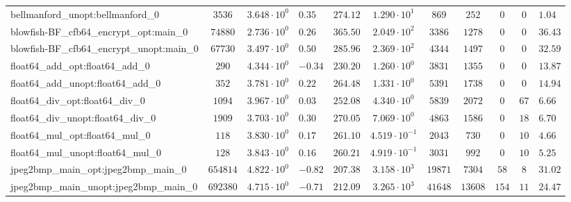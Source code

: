 \begin{tabular}{|l|c|HHc|c|c|c|c|cH|}
bellmanford\_unopt:bellmanford\_0               & $ 3536     $ & $ 3.648 \cdot 10^{0} $ & $ 0.35  $ & $ 274.12 $ & $ 1.290 \cdot 10^{1}  $ & $ 869    $ & $ 252   $ & $ 0   $ & $ 0   $ & $ 1.04    $ \\
blowfish-BF\_cfb64\_encrypt\_opt:main\_0        & $ 74880    $ & $ 2.736 \cdot 10^{0} $ & $ 0.26  $ & $ 365.50 $ & $ 2.049 \cdot 10^{2}  $ & $ 3386   $ & $ 1278  $ & $ 0   $ & $ 0   $ & $ 36.43   $ \\
blowfish-BF\_cfb64\_encrypt\_unopt:main\_0      & $ 67730    $ & $ 3.497 \cdot 10^{0} $ & $ 0.50  $ & $ 285.96 $ & $ 2.369 \cdot 10^{2}  $ & $ 4344   $ & $ 1497  $ & $ 0   $ & $ 0   $ & $ 32.59   $ \\
float64\_add\_opt:float64\_add\_0               & $ 290      $ & $ 4.344 \cdot 10^{0} $ & $ -0.34 $ & $ 230.20 $ & $ 1.260 \cdot 10^{0}  $ & $ 3831   $ & $ 1355  $ & $ 0   $ & $ 0   $ & $ 13.87   $ \\
float64\_add\_unopt:float64\_add\_0             & $ 352      $ & $ 3.781 \cdot 10^{0} $ & $ 0.22  $ & $ 264.48 $ & $ 1.331 \cdot 10^{0}  $ & $ 5391   $ & $ 1738  $ & $ 0   $ & $ 0   $ & $ 14.94   $ \\
float64\_div\_opt:float64\_div\_0               & $ 1094     $ & $ 3.967 \cdot 10^{0} $ & $ 0.03  $ & $ 252.08 $ & $ 4.340 \cdot 10^{0}  $ & $ 5839   $ & $ 2072  $ & $ 0   $ & $ 67  $ & $ 6.66    $ \\
float64\_div\_unopt:float64\_div\_0             & $ 1909     $ & $ 3.703 \cdot 10^{0} $ & $ 0.30  $ & $ 270.05 $ & $ 7.069 \cdot 10^{0}  $ & $ 4863   $ & $ 1586  $ & $ 0   $ & $ 18  $ & $ 6.70    $ \\
float64\_mul\_opt:float64\_mul\_0               & $ 118      $ & $ 3.830 \cdot 10^{0} $ & $ 0.17  $ & $ 261.10 $ & $ 4.519 \cdot 10^{-1} $ & $ 2043   $ & $ 730   $ & $ 0   $ & $ 10  $ & $ 4.66    $ \\
float64\_mul\_unopt:float64\_mul\_0             & $ 128      $ & $ 3.843 \cdot 10^{0} $ & $ 0.16  $ & $ 260.21 $ & $ 4.919 \cdot 10^{-1} $ & $ 3031   $ & $ 992   $ & $ 0   $ & $ 10  $ & $ 5.25    $ \\
jpeg2bmp\_main\_opt:jpeg2bmp\_main\_0           & $ 654814   $ & $ 4.822 \cdot 10^{0} $ & $ -0.82 $ & $ 207.38 $ & $ 3.158 \cdot 10^{3}  $ & $ 19871  $ & $ 7304  $ & $ 58  $ & $ 8   $ & $ 31.02   $ \\
jpeg2bmp\_main\_unopt:jpeg2bmp\_main\_0         & $ 692380   $ & $ 4.715 \cdot 10^{0} $ & $ -0.71 $ & $ 212.09 $ & $ 3.265 \cdot 10^{3}  $ & $ 41648  $ & $ 13608 $ & $ 154 $ & $ 11  $ & $ 24.47   $ \\

\end{tabular}
